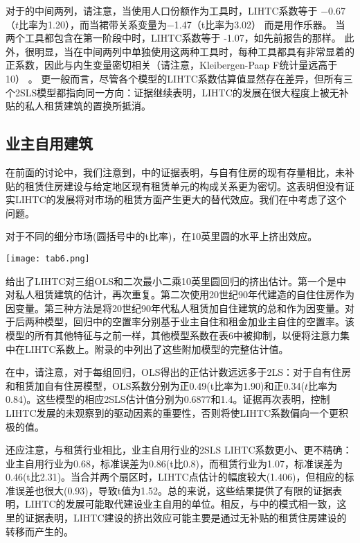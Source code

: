 \documentclass[lang=cn,11pt,a4paper]{paper}
\begin{document}
对于的中间两列，请注意，当使用人口份额作为工具时，LIHTC系数等于 −0.67（$t$比率为1.20），而当裙带关系变量为−1.47（t比率为3.02） 而是用作乐器。 当两个工具都包含在第一阶段中时，LIHTC系数等于 -1.07，如先前报告的那样。 此外，很明显，当在中间两列中单独使用这两种工具时，每种工具都具有非常显着的正系数，因此与内生变量密切相关（请注意，Kleibergen-Paap F统计量远高于10） 。 更一般而言，尽管各个模型的LIHTC系数估算值显然存在差异，但所有三个2SLS模型都指向同一方向：证据继续表明，LIHTC的发展在很大程度上被无补贴的私人租赁建筑的置换所抵消。

\subsection{业主自用建筑}

在前面的讨论中，我们注意到，中的证据表明，与自有住房的现有存量相比，未补贴的租赁住房建设与给定地区现有租赁单元的构成关系更为密切。这表明但没有证实LIHTC的发展将对市场的租赁方面产生更大的替代效应。我们在中考虑了这个问题。

\begin{table}[h]
  \caption{对于不同的细分市场(圆括号中的t比率)，在10英里圆的水平上挤出效应。}\label{tab6}
  \texttt{[image: tab6.png]}
\noindent{}
\end{table}

给出了LIHTC对三组OLS和二次最小二乘10英里圆回归的挤出估计。第一个是中对私人租赁建筑的估计，再次重复。第二次使用20世纪90年代建造的自住住房作为因变量。第三种方法是将20世纪90年代私人租赁加自住建筑的总和作为因变量。对于后两种模型，回归中的空置率分别基于业主自住和租金加业主自住的空置率。该模型的所有其他特征与之前一样，其他模型系数在表6中被抑制，以便将注意力集中在LIHTC系数上。附录的中列出了这些附加模型的完整估计值。

在中，请注意，对于每组回归，OLS得出的正估计数远远多于2LS：对于自有住房和租赁加自有住房模型，OLS系数分别为正0.49(t比率为1.90)和正0.34($t$比率为0.84)。这些模型的相应2SLS估计值分别为0.6877和1.4。证据再次表明，控制LIHTC发展的未观察到的驱动因素的重要性，否则将使LIHTC系数偏向一个更积极的值。

还应注意，与租赁行业相比，业主自用行业的2SLS LIHTC系数更小、更不精确：业主自用行业为0.68，标准误差为0.86(t比0.8)，而租赁行业为1.07，标准误差为0.46(t比2.31)。当合并两个扇区时，LIHTC点估计的幅度较大(1.406)，但相应的标准误差也很大(0.93)，导致t值为1.52。总的来说，这些结果提供了有限的证据表明，LIHTC的发展可能取代建设业主自用的单位。相反，与中的模式相一致，这里的证据表明，LIHTC建设的挤出效应可能主要是通过无补贴的租赁住房建设的转移而产生的。
\end{document}
